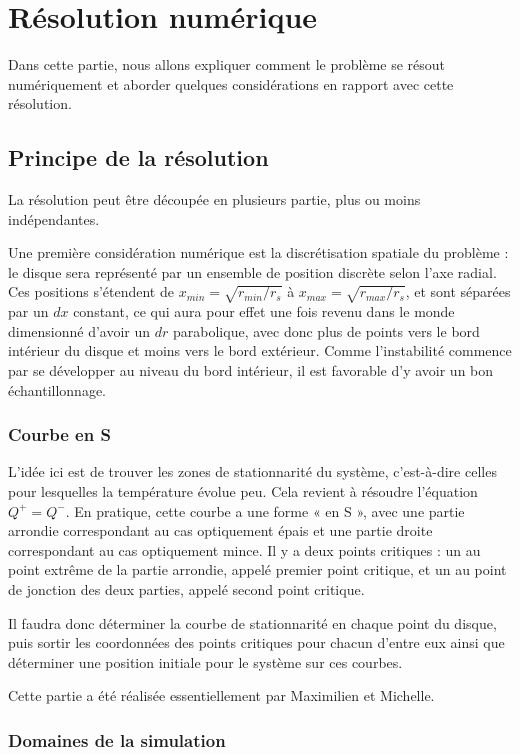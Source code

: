 \section{Résolution numérique}

Dans cette partie, nous allons expliquer comment le problème se résout
numériquement et aborder quelques considérations en rapport avec cette
résolution.

\subsection{Principe de la résolution}
La résolution peut être découpée en plusieurs partie, plus ou moins
indépendantes.

Une première considération numérique est la discrétisation spatiale du problème
: le disque sera représenté par un ensemble de position discrète selon l’axe
radial. Ces positions s’étendent de $x_{min} = \sqrt{r_{min}/r_s}$ à $x_{max} =
\sqrt{r_{max}/r_s}$, et sont séparées par un $dx$ constant, ce qui aura pour
effet une fois revenu dans le monde dimensionné d’avoir un $dr$ parabolique,
avec donc plus de points vers le bord intérieur du disque et moins vers le bord
extérieur. Comme l'instabilité commence par se développer au niveau du bord intérieur, il est favorable d'y avoir un bon échantillonnage.

\subsubsection{Courbe en S}

L’idée ici est de trouver les zones de stationnarité du système, c’est-à-dire
celles pour lesquelles la température évolue peu. Cela revient à résoudre
l’équation $Q^+ = Q^-$. En pratique, cette courbe a une forme « en S », avec
une partie arrondie correspondant au cas optiquement épais et une partie droite
correspondant au cas optiquement mince. Il y a deux points critiques : un au
point extrême de la partie arrondie, appelé premier point critique, et un au
point de jonction des deux parties, appelé second point critique.

Il faudra donc déterminer la courbe de stationnarité en chaque point du disque,
puis sortir les coordonnées des points critiques pour chacun d’entre eux ainsi
que déterminer une position initiale pour le système sur ces courbes.

Cette partie a été réalisée essentiellement par Maximilien et Michelle.

\subsubsection{Domaines de la simulation}

